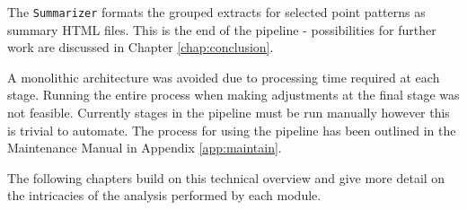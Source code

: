   The \texttt{Summarizer} formats the grouped extracts for selected point patterns as summary HTML files. This is the end of the pipeline - possibilities for further work are discussed in Chapter \ref{chap:conclusion}.

  A monolithic architecture was avoided due to processing time required at each stage. Running the entire process when making adjustments at the final stage was not feasible. Currently stages in the pipeline must be run manually however this is trivial to automate. The process for using the pipeline has been outlined in the Maintenance Manual in Appendix \ref{app:maintain}.

  The following chapters build on this technical overview and give more detail on the intricacies of the analysis performed by each module.

